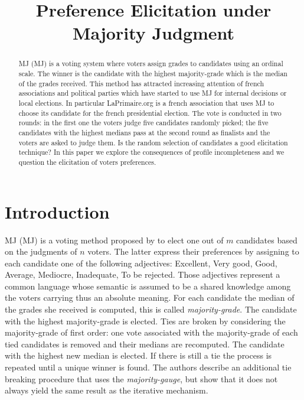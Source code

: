\documentclass[version=3.21, pagesize, twoside=off, bibliography=totoc, DIV=calc, fontsize=12pt, a4paper]{scrartcl}
\title{Preference Elicitation under Majority Judgment}
\author{}
\begin{document}
\maketitle

\begin{abstract}
\acl{MJ} (\acs{MJ}) is a voting system where voters assign grades to candidates using an ordinal scale. The winner is the candidate with the highest majority-grade \textemdash which is the median of the grades received. This method has attracted increasing attention of french associations and political parties which have started to use \acs{MJ} for internal decisions or local elections. In particular LaPrimaire.org is a french association that uses \acs{MJ} to choose its candidate for the french presidential election. The vote is conducted in two rounds: in the first one the voters judge five candidates randomly picked; the five candidates with the highest medians pass at the second round as finalists and the voters are asked to judge them. Is the random selection of candidates a good elicitation technique? In this paper we explore the consequences of profile incompleteness and we question the elicitation of voters preferences.
\end{abstract}

\section{Introduction}
\label{sec:intro}
\acl{MJ} (\acs{MJ}) is a voting method proposed by \citet{Balinski2007,Balinski2011} to elect one out of $m$ candidates based on the judgments of $n$ voters. The latter express their preferences by assigning to each candidate one of the following adjectives: Excellent, Very good, Good, Average, Mediocre, Inadequate, To be rejected. Those adjectives represent a common language whose semantic is assumed to be a shared knowledge among the voters carrying thus an absolute meaning. For each candidate the median of the grades she received is computed, this is called \textit{majority-grade}. The candidate with the highest majority-grade is elected. Ties are broken by considering the majority-grade of first order: one vote associated with the majority-grade of each tied candidates is removed and their medians are recomputed. The candidate with the highest new median is elected. If there is still a tie the process is repeated until a unique winner is found. The authors describe an additional tie breaking procedure that uses the \textit{majority-gauge}, but \citet{Felsenthal2008} show that it does not always yield the same result as the iterative mechanism.
\end{document}

